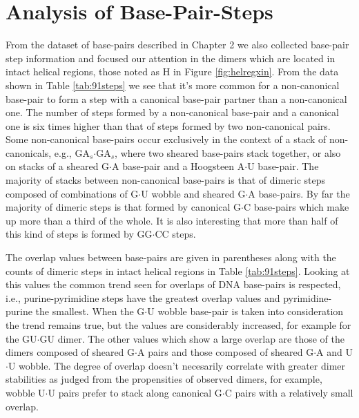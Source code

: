\section{Analysis of Base-Pair-Steps}
From  the  dataset  of  base-pairs  described in  Chapter  2  we  also
collected base-pair step information  and focused our attention in the
dimers which are  located in intact helical regions,  those noted as H
in  Figure   \ref{fig:helregxin}.   From  the  data   shown  in  Table
\ref{tab:91steps}  we see that  it's more  common for  a non-canonical
base-pair to  form a  step with a  canonical base-pair partner  than a
non-canonical  one.  The  number of  steps formed  by  a non-canonical
base-pair and a  canonical one is six times higher  than that of steps
formed  by  two non-canonical  pairs.   Some non-canonical  base-pairs
occur exclusively in  the context of a stack  of non-canonicals, e.g.,
GA$_{s}$$\cdot$GA$_{s}$, where two  sheared base-pairs stack together,
or also  on stacks  of a sheared  G$\cdot$A base-pair and  a Hoogsteen
A$\cdot$U  base-pair.  The  majority of  stacks  between non-canonical
base-pairs  is  that of  dimeric  steps  composed  of combinations  of
G$\cdot$U wobble and sheared G$\cdot$A base-pairs. By far the majority
of  dimeric steps  is that  formed by  canonical  G$\cdot$C base-pairs
which make up  more than a third of the whole.  It is also interesting
that more  than half of  this kind of  steps is formed  by GG$\cdot$CC
steps.

The overlap  values between base-pairs are given  in parentheses along
with the  counts of dimeric steps  in intact helical  regions in Table
\ref{tab:91steps}. Looking  at this values  the common trend  seen for
overlaps of DNA base-pairs is respected, i.e., purine-pyrimidine steps
have   the   greatest  overlap   values   and  pyrimidine-purine   the
smallest.  When   the  G$\cdot$U   wobble  base-pair  is   taken  into
consideration the trend remains  true, but the values are considerably
increased,  for example for  the GU$\cdot$GU  dimer. The  other values
which show a large overlap are those of the dimers composed of sheared
G$\cdot$A pairs and those  composed of sheared G$\cdot$A and U$\cdot$U
wobble.  The degree of overlap doesn't necesarily correlate with greater
dimer stabilities as judged from the propensities of observed
dimers,  for example,  wobble U$\cdot$U  pairs prefer  to  stack along
canonical G$\cdot$C pairs with a relatively small overlap.


